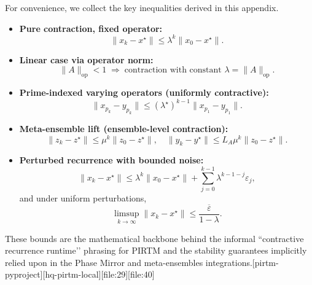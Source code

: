\documentclass[11pt]{article}
\begin{document}
For convenience, we collect the key inequalities derived in this appendix.

\begin{itemize}
  \item \textbf{Pure contraction, fixed operator:}
  \[
    \|x_k - x^\star\| \leq \lambda^k \|x_0 - x^\star\|.
  \]
  \item \textbf{Linear case via operator norm:}
  \[
    \|A\|_{\mathrm{op}} < 1 \;\Rightarrow\; \text{contraction with constant }\lambda=\|A\|_{\mathrm{op}}.
  \]
  \item \textbf{Prime-indexed varying operators (uniformly contractive):}
  \[
    \|x_{p_k} - y_{p_k}\| \leq (\lambda^\star)^{k-1} \|x_{p_1} - y_{p_1}\|.
  \]
  \item \textbf{Meta-ensemble lift (ensemble-level contraction):}
  \[
    \|z_k - z^\star\| \leq \mu^k \|z_0 - z^\star\|,\quad
    \|y_k - y^\star\| \leq L_A \mu^k \|z_0 - z^\star\|.
  \]
  \item \textbf{Perturbed recurrence with bounded noise:}
  \[
    \|x_k - x^\star\|
    \leq \lambda^k \|x_0 - x^\star\|
       + \sum_{j=0}^{k-1} \lambda^{k-1-j} \varepsilon_j,
  \]
  and under uniform perturbations,
  \[
    \limsup_{k\to\infty} \|x_k - x^\star\|
    \leq \frac{\overline{\varepsilon}}{1-\lambda}.
  \]
\end{itemize}

These bounds are the mathematical backbone behind the informal ``contractive recurrence runtime’’ phrasing for PIRTM and the stability guarantees implicitly relied upon in the Phase Mirror and meta-ensembles integrations.[pirtm-pyproject][hq-pirtm-local][file:29][file:40]

\nocite{*}
  

\end{document}
